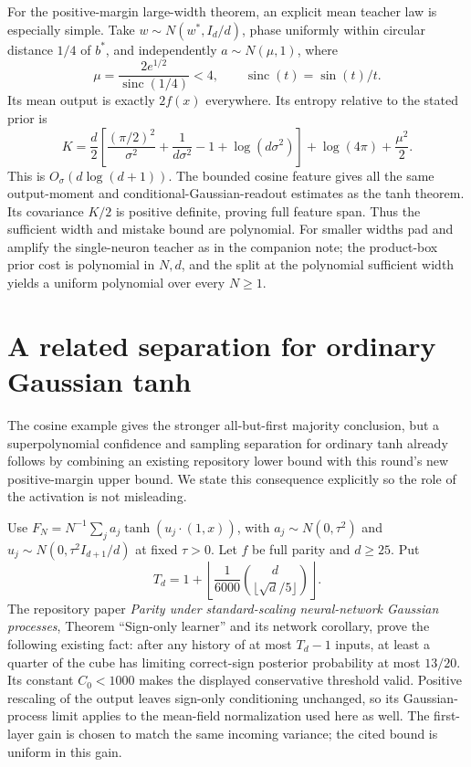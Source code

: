 \documentclass[11pt]{article}
\begin{document}
For the positive-margin large-width theorem, an explicit mean teacher
law is especially simple. Take $w\sim N(w^*,I_d/d)$, phase uniformly
within circular distance $1/4$ of $b^*$, and independently
$a\sim N(\mu,1)$, where
\[
 \mu=\frac{2e^{1/2}}{\operatorname{sinc}(1/4)}<4,
 \qquad\operatorname{sinc}(t)=\sin(t)/t.
\]
Its mean output is exactly $2f(x)$ everywhere. Its entropy relative to
the stated prior is
\[
 K=\frac d2\left[\frac{(\pi/2)^2}{\sigma^2}
       +\frac1{d\sigma^2}-1+\log(d\sigma^2)\right]
       +\log(4\pi)+\frac{\mu^2}{2}.
\]
This is $O_\sigma(d\log(d+1))$. The bounded cosine feature gives all
the same output-moment and conditional-Gaussian-readout estimates as
the tanh theorem. Its covariance $K/2$ is positive definite, proving
full feature span. Thus the sufficient width and mistake bound are
polynomial. For smaller widths pad and amplify the single-neuron teacher
as in the companion note; the product-box prior cost is polynomial in
$N,d$, and the split at the polynomial sufficient width yields a
uniform polynomial over every $N\ge1$.

\section{A related separation for ordinary Gaussian tanh}
The cosine example gives the stronger all-but-first majority conclusion,
but a superpolynomial confidence and sampling separation for ordinary
tanh already follows by combining an existing repository lower bound
with this round's new positive-margin upper bound. We state this
consequence explicitly so the role of the activation is not misleading.

Use $F_N=N^{-1}\sum_j a_j\tanh(u_j\cdot(1,x))$, with
$a_j\sim N(0,\tau^2)$ and $u_j\sim N(0,\tau^2I_{d+1}/d)$ at fixed
$\tau>0$. Let $f$ be full parity and $d\ge25$. Put
\[
 T_d=1+\left\lfloor\frac1{6000}
           \binom d{\lfloor\sqrt d/5\rfloor}\right\rfloor.
\]
The repository paper \emph{Parity under standard-scaling neural-network
Gaussian processes}, Theorem ``Sign-only learner'' and its network
corollary, prove the following existing fact: after any history of at
most $T_d-1$ inputs, at least a quarter of the cube has limiting
correct-sign posterior probability at most $13/20$.
Its constant $C_0<1000$ makes the displayed conservative threshold valid.
Positive rescaling of the output leaves sign-only conditioning unchanged,
so its Gaussian-process limit applies to the mean-field normalization
used here as well. The first-layer gain is chosen to match the same
incoming variance; the cited bound is uniform in this gain.
\end{document}
